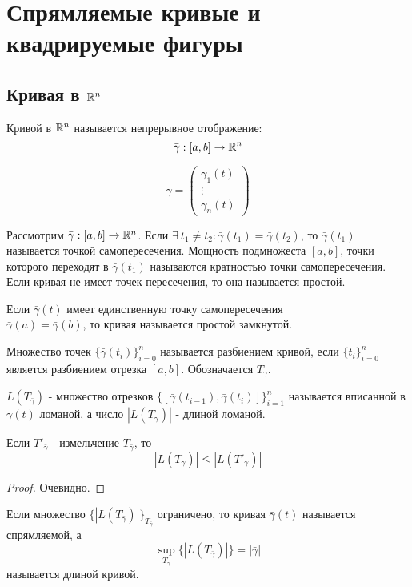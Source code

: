 \section{Спрямляемые кривые и квадрируемые фигуры}
\subsection{Кривая в \texorpdfstring{$\mathbb{R}^n$}{Rn}}

\begin{definition}
    Кривой в $\mathbb{R}^n$ называется непрерывное отображение:
    \[\bar{\gamma}: [a,b]\to \mathbb{R}^n\]
\end{definition} 
\begin{comm}
    \[\bar{\gamma}=\begin{pmatrix}
       \gamma_1(t)\\
       \vdots\\
       \gamma_n(t) 
    \end{pmatrix}\]
\end{comm} 
\begin{definition}
    Рассмотрим $\bar{\gamma}: [a,b]\to \mathbb{R}^n$. Если $\exists\ t_1\ne t_2: \bar{\gamma}(t_1)=\bar{\gamma}(t_2)$, то $\bar{\gamma}(t_1)$ называется точкой самопересечения. Мощность подмножеста $[a,b]$, точки которого переходят в $\bar{\gamma}(t_1)$ называются кратностью точки самопересечения. Если кривая не имеет точек пересечения, то она называется простой.
\end{definition} 
\begin{definition}
    Если $\bar{\gamma}(t)$ имеет единственную точку самопересечения\\
    $\bar{\gamma}(a)=\bar{\gamma}(b)$, то кривая называется простой замкнутой.
\end{definition} 
\begin{definition}
    Множество точек $\{\bar{\gamma}(t_i)\}_{i=0}^n$ называется разбиением кривой, если $\{t_i\}_{i=0}^n$ является разбиением отрезка $[a,b]$. Обозначается $T_{\gamma}$.
\end{definition} 
\begin{definition}
    $L(T_{\bar{\gamma}})$ - множество отрезков $\{[\bar{\gamma}(t_{i-1}),\bar{\gamma}(t_i)]\}_{i=1}^n$ называется вписанной в $\bar{\gamma}(t)$ ломаной, а число $|L(T_{\bar{\gamma}})|$ - длиной ломаной.
\end{definition} 
\begin{statement}
    Если $T'_{\bar{\gamma}}$ - измельчение $T_{\bar{\gamma}}$, то 
    \[|L(T_{\bar{\gamma}})|\leq |L(T'_{\bar{\gamma}})|\]
\end{statement} 
\begin{proof}
    Очевидно.
\end{proof} 
\begin{definition}
    Если множество $\{|L(T_{\bar{\gamma}})|\}_{T_{\bar{\gamma}}}$ ограничено, то кривая $\bar{\gamma}(t)$ называется спрямляемой, а
    \[\sup\limits_{T_{\bar{\gamma}}}\{|L(T_{\bar{\gamma}})|\}=|\bar{\gamma}|\]
    называется длиной кривой.
\end{definition} 